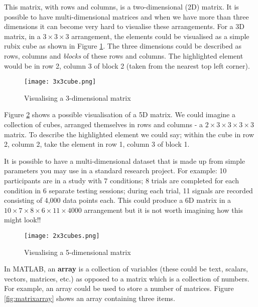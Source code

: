 \documentclass[12pt,a4paper]{article}
\begin{document}
{This matrix, with rows and columns, is a two-dimensional (2D) matrix.  
It is possible to have multi-dimensional matrices and when we have more than three dimensions it can become very hard to visualise these arrangements.  
For a 3D matrix, in a $3\times3\times3$ arrangement, the elements could be visualised as a simple rubix cube as shown in Figure \ref{fig:3dmatrix}.  
The three dimensions could be described as rows, columns and \emph{blocks} of these rows and columns.  
The highlighted element would be in row 2, column 3 of block 2 (taken from the nearest top left corner).

\begin{figure}[H]
\begin{center}
\texttt{[image: 3x3cube.png]}
\caption{Visualising a 3-dimensional matrix}
\label{fig:3dmatrix}
\end{center}
\end{figure}

Figure \ref{fig:5dmatrix} shows a possible visualisation of a 5D matrix.  
We could imagine a collection of cubes, arranged themselves in rows and columns - a $2\times3\times3\times3\times3$ matrix.  
To describe the highlighted element we could say; within the cube in row 2, column 2, take the element in row 1, column 3 of block 1.

It is possible to have a multi-dimensional dataset that is made up from simple parameters you may use in a standard research project.  
For example: 10 participants are in a study with 7 conditions;  
8 trials are completed for each condition in 6 separate testing sessions;  
during each trial, 11 signals are recorded consisting of 4,000 data points each.  
This could produce a 6D matrix in a $10\times7\times8\times6\times11\times4000$ arrangement but it is not worth imagining how this might look!!

\begin{figure}[H]
\begin{center}
\texttt{[image: 2x3cubes.png]}
\caption{Visualising a 5-dimensional matrix}
\label{fig:5dmatrix}
\end{center}
\end{figure}

In MATLAB, an \textbf{array} is a collection of variables (these could be text, scalars, vectors, matrices, etc.) as opposed to a matrix which is a collection of numbers.  
For example, an array could be used to store a number of matrices.  
Figure \ref{fig:matrixarray} shows an array containing three items.

}
\end{document}
